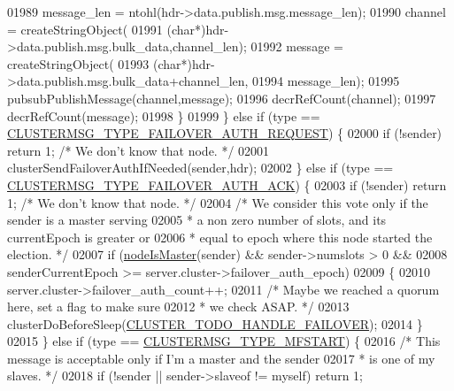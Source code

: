 \begin{DoxyCode}
{{{{{{{{{{{{{{{{{{{{{{{{{{{{{{{{{{01989             message\_len = ntohl(hdr->data.publish.msg.message\_len);
01990             channel = createStringObject(
01991                         (\textcolor{keywordtype}{char}*)hdr->data.publish.msg.bulk\_data,channel\_len);
01992             message = createStringObject(
01993                         (\textcolor{keywordtype}{char}*)hdr->data.publish.msg.bulk\_data+channel\_len,
01994                         message\_len);
01995             pubsubPublishMessage(channel,message);
01996             decrRefCount(channel);
01997             decrRefCount(message);
01998         \}
01999     \} \textcolor{keywordflow}{else} \textcolor{keywordflow}{if} (type == \hyperlink{cluster_8h_a739009308ed4cb5b19630a5f872408d2}{CLUSTERMSG\_TYPE\_FAILOVER\_AUTH\_REQUEST}) \{
02000         \textcolor{keywordflow}{if} (!sender) \textcolor{keywordflow}{return} 1;  \textcolor{comment}{/* We don't know that node. */}
02001         clusterSendFailoverAuthIfNeeded(sender,hdr);
02002     \} \textcolor{keywordflow}{else} \textcolor{keywordflow}{if} (type == \hyperlink{cluster_8h_ae0db3a998d7da521c5359bdd8708f5f6}{CLUSTERMSG\_TYPE\_FAILOVER\_AUTH\_ACK}) \{
02003         \textcolor{keywordflow}{if} (!sender) \textcolor{keywordflow}{return} 1;  \textcolor{comment}{/* We don't know that node. */}
02004         \textcolor{comment}{/* We consider this vote only if the sender is a master serving}
02005 \textcolor{comment}{         * a non zero number of slots, and its currentEpoch is greater or}
02006 \textcolor{comment}{         * equal to epoch where this node started the election. */}
02007         \textcolor{keywordflow}{if} (\hyperlink{cluster_8h_a2d8e84269474d8750565fb3fb67aa436}{nodeIsMaster}(sender) && sender->numslots > 0 &&
02008             senderCurrentEpoch >= server.cluster->failover\_auth\_epoch)
02009         \{
02010             server.cluster->failover\_auth\_count++;
02011             \textcolor{comment}{/* Maybe we reached a quorum here, set a flag to make sure}
02012 \textcolor{comment}{             * we check ASAP. */}
02013             clusterDoBeforeSleep(\hyperlink{cluster_8h_afb969dfe84cf59e2340ed10cbf334a47}{CLUSTER\_TODO\_HANDLE\_FAILOVER});
02014         \}
02015     \} \textcolor{keywordflow}{else} \textcolor{keywordflow}{if} (type == \hyperlink{cluster_8h_aa875273b4b11ae73d3cd3a8aea4ddcba}{CLUSTERMSG\_TYPE\_MFSTART}) \{
02016         \textcolor{comment}{/* This message is acceptable only if I'm a master and the sender}
02017 \textcolor{comment}{         * is one of my slaves. */}
02018         \textcolor{keywordflow}{if} (!sender || sender->slaveof != myself) \textcolor{keywordflow}{return} 1;
}}}}}}}}}}}}}}}}}}}}}}}}}}}}}}}}}}
\end{DoxyCode}
